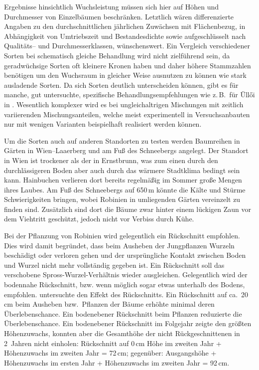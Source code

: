 \documentclass[twocolumn]{scrartcl}
\begin{document}
Ergebnisse hinsichtlich Wuchsleistung müssen sich hier auf Höhen und
Durchmesser von Einzelbäumen beschränken.  Letztlich wären
differenzierte Angaben zu den durchschnittlichen jährlichen Zuwächsen
mit Flächenbezug, in Abhängigkeit von Umtriebszeit und Bestandesdichte
sowie aufgeschlüsselt nach Qualitäts-- und Durchmesserklassen,
wünschenswert.  Ein Vergleich verschiedener Sorten bei schematisch
gleiche Behandlung wird nicht zielführend sein, da geradwüchsige
Sorten oft kleinere Kronen haben \citep{bujtas1984robinie} und daher
höhere Stammzahlen benötigen \citep{keresztesi1974robinie} um den
Wuchsraum in gleicher Weise ausnutzen zu können wie stark ausladende
Sorten. Da sich Sorten deutlich unterscheiden können, gibt es für
manche, gut untersuchte, spezifische Behandlungsempfehlungen wie
z.\,B.\ für Üllői in \citet{redei2020ulloi}. Wesentlich komplexer wird
es bei ungleichaltrigen Mischungen mit zeitlich variierenden
Mischungsanteilen, welche meist experimentell in Versuchsanbauten nur
mit wenigen Varianten beispielhaft realisiert werden können.

Um die Sorten auch auf anderen Standorten zu testen werden Baumreihen in Gärten
in Wien--Laaerberg und am Fuß des Schneebergs angelegt. Der Standort in Wien ist
trockener als der in Ernstbrunn, was zum einen durch den durchlässigeren Boden
aber auch durch das wärmere Stadtklima bedingt sein kann. Hainbuchen verlieren
dort bereits regelmäßig im Sommer große Mengen ihres Laubes. Am Fuß des
Schneebergs auf 650\,m könnte die Kälte und Stürme Schwierigkeiten bringen,
wobei Robinien in umliegenden Gärten vereinzelt zu finden sind. Zusätzlich sind
dort die Bäume zwar hinter einem lückigen Zaun vor dem Viehtritt geschützt,
jedoch nicht vor Verbiss durch Kühe.

Bei der Pflanzung von Robinien wird gelegentlich ein Rückschnitt
empfohlen.
Dies wird damit begründet, dass beim Ausheben der Jungpflanzen Wurzeln beschädigt oder verloren gehen
und der ursprüngliche Kontakt zwischen Boden und Wurzel nicht mehr vollständig gegeben ist.
Ein Rückschnitt soll das verschobene Spross-Wurzel-Verhältnis wieder ausgleichen.
Gelegentlich wird der
bodennahe Rückschnitt, bzw. wenn möglich sogar etwas unterhalb des
Bodens, empfohlen.
\citet{meginnis1940robinieRueckschnitt}
untersuchte den Effekt des Rückschnitts. Ein Rückschnitt auf
ca.\ 20\,cm beim Ausheben bzw.\ Pflanzen der Bäume erhöhte minimal
deren Überlebenschance. Ein bodenebener Rückschnitt beim Pflanzen
reduzierte die Überlebenschance. Ein bodenebener Rückschnitt im
Folgejahr zeigte den größten Höhenzuwachs, konnten aber die Gesamthöhe
der nicht Rückgeschnittenen in 2~Jahren nicht einholen:
Rückschnitt auf 0\,cm Höhe im zweiten Jahr + Höhenzuwachs im zweiten Jahr = 72\,cm;
gegenüber: Ausgangshöhe + Höhenzuwachs im ersten Jahr + Höhenzuwachs im zweiten Jahr = 92\,cm.
\end{document}
